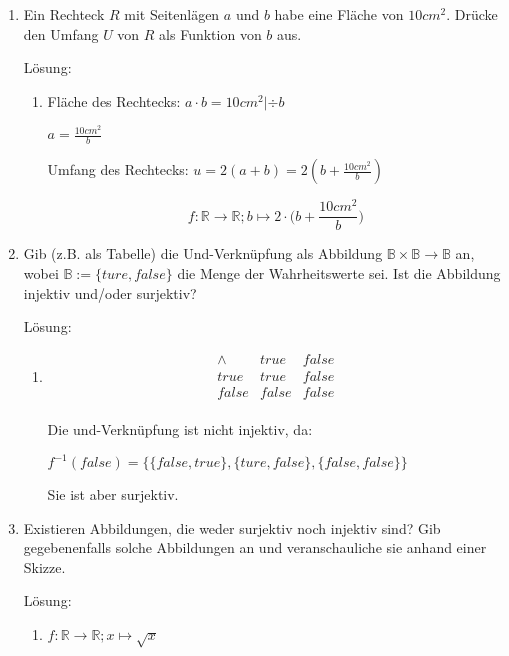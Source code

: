 \documentclass[main.tex]{subfiles}
\begin{document}
\begin{enumerate}
	\item Ein Rechteck \( R \) mit Seitenlägen \( a \) und \( b \)
	      habe eine Fläche von \( 10 cm^2 \). Drücke den Umfang \( U \) von \( R \) als Funktion von \( b \) aus.

	      Lösung:
	      \begin{enumerate}
		      \item Fläche des Rechtecks:
		            \( a \cdot b = 10 cm^2 | \div b\)

		            \( a = \frac{10 cm^2}{b} \)

		            Umfang des Rechtecks:
		            \( u = 2(a + b)
		            = 2 ( b + \frac{10 cm^2}{b} ) \)

		            \[ f: \mathbb{R} \rightarrow \mathbb{R}; b \mapsto 2 \cdot \Big( b + \frac{10 cm^2}{b} \Big)  \]
	      \end{enumerate}
	\item  Gib (z.B. als Tabelle) die Und-Verknüpfung als Abbildung \( \mathbb{B} \times \mathbb{B} \rightarrow \mathbb{B} \) an,
	      wobei \( \mathbb{B} := \{ ture, false \} \) die Menge der Wahrheitswerte sei.
	      Ist die Abbildung injektiv und/oder surjektiv?

	      Lösung:
	      \begin{enumerate}
		      \item \[
			            \begin{array}{c|c|c}
				            \land & true  & false \\
				            \hline
				            true  & true  & false \\
				            \hline
				            false & false & false \\
			            \end{array}
		            \]

		            Die und-Verknüpfung ist nicht injektiv, da:

		            \( f^{-1}(false) = \{\{false, true\}, \{ture, false\}, \{false, false\}\} \)

		            Sie ist aber surjektiv.
	      \end{enumerate}
	\item Existieren Abbildungen, die weder surjektiv noch injektiv sind?
	      Gib gegebenenfalls solche Abbildungen an und veranschauliche sie anhand einer Skizze.

	      Lösung:
	      \begin{enumerate}
		      \item \( f: \mathbb{R} \rightarrow \mathbb{R}; x \mapsto \sqrt{x} \)


\end{enumerate}
\end{enumerate}
\end{document}
